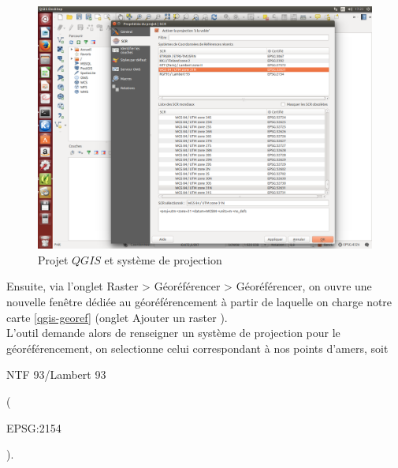 \documentclass{book}
\begin{document}
\begin{figure}[H]
\begin{center}
\includegraphics[scale=0.3]{images/georeferencing/qgis-projet.png}
\end{center}
\caption{Projet $QGIS$ et système de projection}
\label{qgis-projet}
\end{figure}

\clearpage

Ensuite, via l'onglet \og Raster > Géoréférencer > Géoréférencer\fg{}, on ouvre 
une nouvelle fen\^{e}tre dédiée au géoréférencement à partir de laquelle on charge notre carte \ref{qgis-georef} 
(onglet \og Ajouter un raster \fg{}).\\
L'outil demande alors de renseigner un système de projection pour le géoréférencement, on selectionne celui correspondant 
à nos points d'amers, soit \begin{itshape}NTF 93/Lambert 93\end{itshape} (\begin{itshape}EPSG:2154\end{itshape}).
\end{document}
